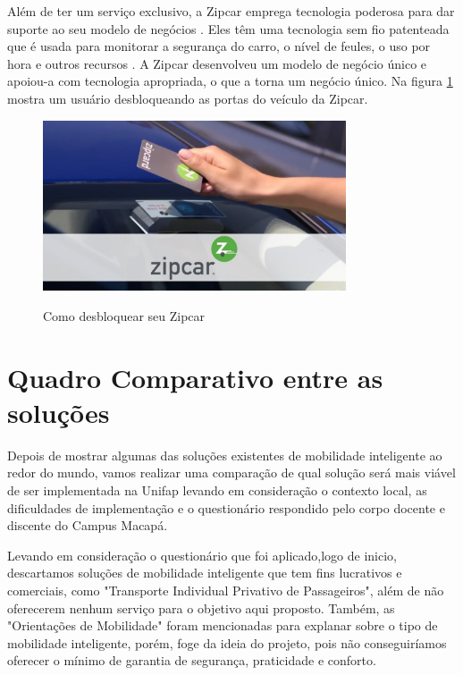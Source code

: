 Além de ter um serviço exclusivo, a Zipcar emprega tecnologia poderosa para dar suporte ao seu modelo de negócios \cite{pearlson2009strategic}. Eles têm uma tecnologia sem fio patenteada que é usada para monitorar a segurança do carro, o nível de feules, o uso por hora e outros recursos \cite{pearlson2009strategic}. A Zipcar desenvolveu um modelo de negócio único e apoiou-a com tecnologia apropriada, o que a torna um negócio único. Na figura \ref{fig:zipcar} mostra um usuário desbloqueando as portas do veículo da Zipcar.

\begin{figure}[!hbtp]
	\centering
	\caption{Como desbloquear seu Zipcar}
	\includegraphics[width=0.8\textwidth]{./04-figuras/zipcar/zipcar.jpg}
	\label{fig:zipcar}
\end{figure}

\section{Quadro Comparativo entre as soluções}
Depois de mostrar algumas das soluções existentes de mobilidade inteligente ao redor do mundo, vamos realizar uma comparação de qual solução será mais viável de ser implementada na Unifap levando em consideração o contexto local, as dificuldades de implementação e o questionário respondido pelo corpo docente e discente do Campus Macapá.

Levando em consideração o questionário que foi aplicado,logo de inicio, descartamos soluções de mobilidade inteligente que tem fins lucrativos e comerciais, como "Transporte Individual Privativo de Passageiros", além de não oferecerem nenhum serviço para o objetivo aqui proposto. Também, as "Orientações de Mobilidade" foram mencionadas para explanar sobre o tipo de mobilidade inteligente, porém, foge da ideia do projeto, pois não conseguiríamos oferecer o mínimo de garantia de segurança, praticidade e conforto.

